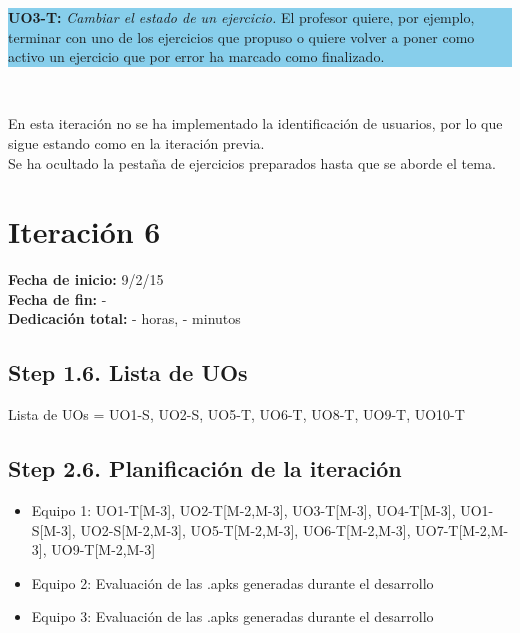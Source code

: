 \vspace{0.1cm}

\colorbox{SkyBlue}{\parbox[c]{1.0\textwidth}{
\textbf{UO3-T:} \textit{Cambiar el estado de un ejercicio.} El profesor quiere, por ejemplo, terminar con uno de los ejercicios que propuso o quiere volver a poner como activo un ejercicio que por error ha marcado como finalizado.\\
}}\\

\vspace{0.1cm}

En esta iteración no se ha implementado la identificación de usuarios, por lo que sigue estando como en la iteración previa.\\

Se ha ocultado la pestaña de ejercicios preparados hasta que se aborde el tema.\\


\section{Iteración 6}
\label{it6}

\begin{flushleft}
\textbf{Fecha de inicio:} 9/2/15\\
\textbf{Fecha de fin:} -\\
\textbf{Dedicación total:} - horas, - minutos\\
\end{flushleft}

\subsection{Step 1.6. Lista de UOs}
\label{it6:1.6}

Lista de UOs = {UO1-S, UO2-S, UO5-T, UO6-T, UO8-T, UO9-T, UO10-T}

\subsection{Step 2.6. Planificación de la iteración}
\label{it6:2.6}

\begin{itemize}
\item Equipo 1: UO1-T[M-3], UO2-T[M-2,M-3], UO3-T[M-3], UO4-T[M-3], UO1-S[M-3], UO2-S[M-2,M-3], UO5-T[M-2,M-3], UO6-T[M-2,M-3], UO7-T[M-2,M-3], UO9-T[M-2,M-3]
\item Equipo 2: Evaluación de las .apks generadas durante el desarrollo
\item Equipo 3: Evaluación de las .apks generadas durante el desarrollo
\end{itemize}

